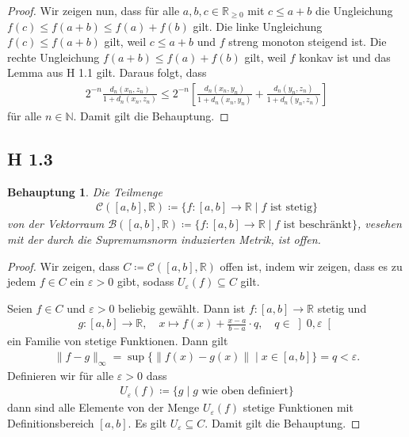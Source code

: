 \documentclass[draft,a5paper]{article}
\newtheorem*{beh}{Behauptung}
\begin{document}
\begin{proof}
  Wir zeigen nun, dass für alle \(a, b, c \in \mathbb{R}_{\ge 0}\) mit
  \(c \le a + b\) die Ungleichung \(f(c) \le f(a+b) \le f(a) + f(b)\) gilt.
  Die linke Ungleichung \(f(c) \le f(a+b)\) gilt, weil \(c \le a+b\) und
  \(f\) streng monoton steigend ist. Die rechte Ungleichung
  \(f(a+b) \le f(a) + f(b)\) gilt, weil \(f\) konkav ist und das Lemma
  aus H 1.1 gilt.  Daraus folgt, dass
  \begin{align*}
    2^{-n} \frac{d_{n}(x_{n}, z_{n})}{1+d_{n}(x_{n}, z_{n})}
    \le 2^{-n} \left[ \frac{d_{n}(x_{n}, y_{n})}{1+ d_{n}(x_{n}, y_{n})}
    + \frac{d_{n}(y_{n}, z_{n})}{1 + d_{n}(y_{n}, z_{n})}\right]
  \end{align*}
  für alle \(n \in \mathbb{N}\).  Damit gilt die Behauptung.
\end{proof}

\subsection*{H 1.3}

\begin{beh}
  Die Teilmenge
  \begin{align*}
    \mathcal{C} ([a, b], \mathbb{R}) \coloneq \{f\colon [a, b] \to \mathbb{R} \mid f \text{ ist stetig}\}
  \end{align*}
  von der Vektorraum
  \(\mathcal{B} ([a, b], \mathbb{R}) \coloneq \{f \colon [a, b] \to \mathbb{R} \mid f \text{ ist beschränkt}\}\),
  vesehen mit der durch die Supremumsnorm induzierten Metrik, ist
  offen.
\end{beh}

\begin{proof}
  Wir zeigen, dass \(C \coloneq \mathcal{C} ([a, b], \mathbb{R})\) offen ist, indem wir zeigen, dass
  es zu jedem \(f \in C\) ein \(\varepsilon > 0\) gibt, sodass \(U_{\varepsilon}(f) \subseteq C\)
  gilt.

  Seien \(f \in C\) und \(\varepsilon > 0\) beliebig gewählt.  Dann ist
  \(f: [a, b] \to \mathbb{R}\) stetig und
  \begin{align*}
    g \colon [a, b] \to \mathbb{R}, \quad x \mapsto f(x) + \frac{x-a}{b-a} \cdot q, \quad q \in \left] 0, \varepsilon \right[
  \end{align*}
  ein Familie von stetige Funktionen. Dann gilt
  \begin{align*}
    \|f - g\|_{\infty}
    = \sup \{ \|f(x) - g(x)\| \mid x \in \left[a, b\right]\}
    = q < \varepsilon.
  \end{align*}
  Definieren wir für alle \(\varepsilon > 0\) dass
  \begin{align*}
    U_{\varepsilon}(f) \coloneq \{ g \mid g \text{ wie oben definiert} \}
  \end{align*}
  dann sind alle Elemente von der Menge \(U_{\varepsilon}(f)\) stetige
  Funktionen mit Definitionsbereich \([a, b]\).  Es gilt \(U_{\varepsilon} \subseteq
  C\).  Damit gilt die Behauptung.
\end{proof}
\end{document}
